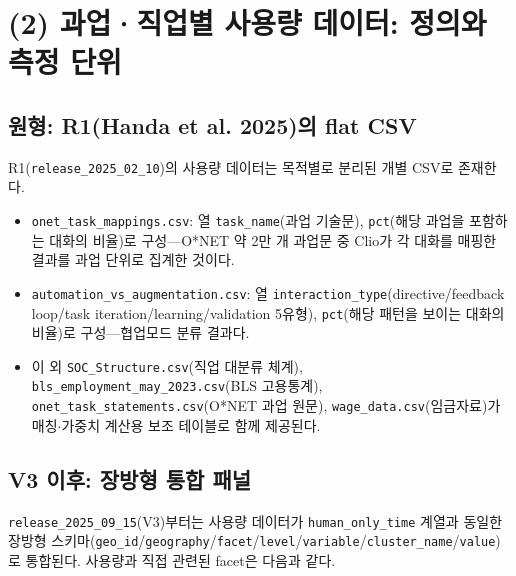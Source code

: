 \documentclass[11pt]{article}
\begin{document}
\section{(2) 과업·직업별 사용량 데이터: 정의와 측정 단위}
\label{sec:usage}

\subsection{원형: R1(Handa et al. 2025)의 flat CSV}

R1(\texttt{release\_2025\_02\_10})의 사용량 데이터는 목적별로 분리된 개별 CSV로 존재한다.

\begin{itemize}[leftmargin=*]
  \item \texttt{onet\_task\_mappings.csv}: 열 \texttt{task\_name}(과업 기술문), \texttt{pct}(해당 과업을 포함하는 대화의 비율)로 구성---O*NET 약 2만 개 과업문 중 Clio가 각 대화를 매핑한 결과를 과업 단위로 집계한 것이다.
  \item \texttt{automation\_vs\_augmentation.csv}: 열 \texttt{interaction\_type}(directive/feedback loop/task iteration/learning/validation 5유형), \texttt{pct}(해당 패턴을 보이는 대화의 비율)로 구성---협업모드 분류 결과다.
  \item 이 외 \texttt{SOC\_Structure.csv}(직업 대분류 체계), \texttt{bls\_employment\_may\_2023.csv}(BLS 고용통계), \texttt{onet\_task\_statements.csv}(O*NET 과업 원문), \texttt{wage\_data.csv}(임금자료)가 매칭$\cdot$가중치 계산용 보조 테이블로 함께 제공된다.
\end{itemize}

\subsection{V3 이후: 장방형 통합 패널}

\texttt{release\_2025\_09\_15}(V3)부터는 사용량 데이터가 \texttt{human\_only\_time} 계열과 동일한 장방형 스키마(\texttt{geo\_id}/\texttt{geography}/\texttt{facet}/\texttt{level}/\texttt{variable}/\texttt{cluster\_name}/\texttt{value})로 통합된다. 사용량과 직접 관련된 facet은 다음과 같다.
\end{document}
